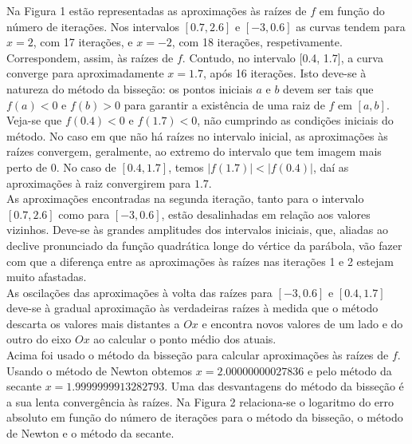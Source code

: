 \documentclass[aps,pre,twocolumn,showpacs,amsmath,amssymb]{revtex4-1}
\begin{document}
Na Figura 1 estão representadas as aproximações às raízes de $f$ em função do número de iterações. Nos intervalos $[0.7, 2.6]$ e $[-3, 0.6]$ as curvas tendem para $x=2$, com 17 iterações, e $x=-2$, com 18 iterações, respetivamente. Correspondem, assim, às raízes de $f$. Contudo, no intervalo [0.4, 1.7], a curva converge para aproximadamente $x=1.7$, após 16 iterações. Isto deve-se à natureza do método da bisseção: os pontos iniciais $a$ e $b$ devem ser tais que $f(a)<0$ e $f(b)>0$ para garantir a existência de uma raiz de $f$ em $[a,b]$. Veja-se que $f(0.4)<0$
e $f(1.7)<0$, não cumprindo as condições iniciais do método. No caso em que não há raízes no intervalo inicial, as aproximações às raízes convergem, geralmente, ao extremo do intervalo que tem imagem mais perto de $0$. No caso de $[0.4,1.7]$, temos $|f(1.7)|<|f(0.4)|$, daí as aproximações à raiz convergirem para $1.7$.\\
As aproximações encontradas na segunda iteração, tanto para o intervalo $[0.7,2.6]$ como para $[-3,0.6]$, estão desalinhadas em relação aos valores vizinhos. Deve-se às grandes amplitudes dos intervalos iniciais, que, aliadas ao declive pronunciado da função quadrática longe do vértice da parábola, vão fazer com que a diferença entre as aproximações às raízes nas iterações 1 e 2 estejam muito afastadas. \\
As oscilações das aproximações à volta das raízes para $[-3,0.6]$ e $[0.4,1.7]$ deve-se à gradual aproximação às verdadeiras raízes à medida que o método descarta os valores mais distantes a $Ox$ e encontra novos valores de um lado e do outro do eixo $Ox$ ao calcular o ponto médio dos atuais.\\

Acima foi usado o método da bisseção para calcular aproximações às raízes de $f$. Usando o método de Newton obtemos $x=2.00000000027836$ e pelo método da secante $x=1.9999999913282793$.
Uma das desvantagens do método da bisseção é a sua lenta convergência às raízes. Na Figura 2 relaciona-se o logaritmo do erro absoluto em função do número de iterações para o método da bisseção, o método de Newton e o método da secante.
\end{document}
